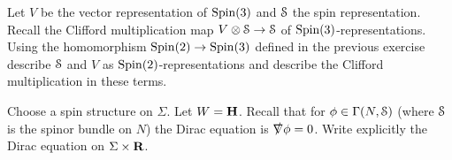 \begin{exercise}
Let $V$ be the vector representation of $\mathrm{Spin}(3)$ and $\mathcal{S}$ the spin representation. Recall the Clifford multiplication map $V\otimes \mathcal{S}\rightarrow \mathcal{S}$ of $\mathrm{Spin}(3)$-representations. Using the homomorphism $\mathrm{Spin}(2)\rightarrow \mathrm{Spin}(3)$ defined in the previous exercise describe $\mathcal{S}$ and $V$ as $\mathrm{Spin}(2)$-representations and describe the Clifford multiplication in these terms.
\end{exercise}

\begin{exercise}
Choose a spin structure on $\Sigma$. Let $W = {\mathbf{H}}$. Recall that for $\phi\in\Gamma(N, \mathcal{S})$ (where $\mathcal{S}$ is the spinor bundle on $N$) the Dirac equation is $\slashed{\nabla}\phi = 0$. Write explicitly the Dirac equation on $\Sigma\times \mathbf{R}$.
\end{exercise}